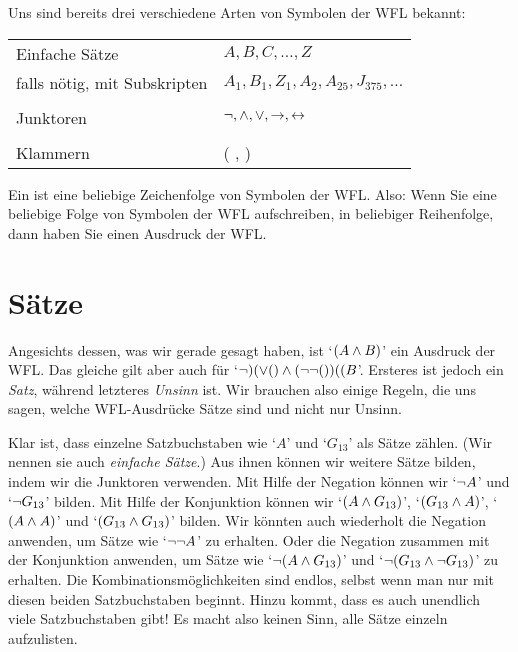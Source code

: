 Uns sind bereits drei verschiedene Arten von Symbolen der WFL bekannt:
\begin{center}
\begin{tabular}{l l}
Einfache Sätze & $A,B,C,\ldots,Z$\\
falls nötig, mit Subskripten & $A_1, B_1,Z_1,A_2,A_{25},J_{375},\ldots$\\
\\
Junktoren & $\neg,\wedge,\vee,\rightarrow,\leftrightarrow$\\
\\
Klammern &( , )\\
\end{tabular}
\end{center}
Ein  ist eine beliebige Zeichenfolge von Symbolen der WFL. Also: Wenn Sie eine beliebige Folge von Symbolen der WFL aufschreiben, in beliebiger Reihenfolge, dann haben Sie einen Ausdruck der WFL. 

\section{Sätze}\label{s:Sentences}
Angesichts dessen, was wir gerade gesagt haben, ist `$(A \wedge B)$' ein Ausdruck der WFL. Das gleiche gilt aber auch für `$\lnot)(\vee()\wedge(\neg\neg())((B$'. Ersteres ist jedoch ein \emph{Satz}, während letzteres \emph{Unsinn} ist. Wir brauchen also einige Regeln, die uns sagen, welche WFL-Ausdrücke Sätze sind und nicht nur Unsinn. 

Klar ist, dass einzelne Satzbuchstaben wie `$A$' und `$G_{13}$' als Sätze zählen. (Wir nennen sie auch \emph{einfache Sätze}.) Aus ihnen können wir weitere Sätze bilden, indem wir die Junktoren verwenden. Mit Hilfe der Negation können wir `$\neg A$' und `$\neg G_{13}$' bilden. Mit Hilfe der Konjunktion können wir `$(A \wedge G_{13})$', `$(G_{13} \wedge A)$', `$(A \wedge A)$' und `$(G_{13} \wedge G_{13})$' bilden. Wir könnten auch wiederholt die Negation anwenden, um Sätze wie `$\neg \neg A$' zu erhalten. Oder die Negation zusammen mit der Konjunktion anwenden, um Sätze wie `$\neg (A \wedge G_{13})$' und `$\neg (G_{13} \wedge \neg G_{13})$' zu erhalten. Die Kombinationsmöglichkeiten sind endlos, selbst wenn man nur mit diesen beiden Satzbuchstaben beginnt. Hinzu kommt, dass es auch unendlich viele Satzbuchstaben gibt! Es macht also keinen Sinn, alle Sätze einzeln aufzulisten.


